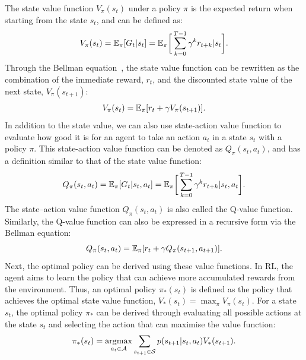The state value function $V_{\pi}(s_{t})$ under a policy $\pi$ is the expected return when starting from the state $s_{t}$, and can be defined as:
\begin{equation}
\centering
    V_{\pi}(s_{t}) = \mathbb{E}_{\pi}[G_{t}|s_{t}] = \mathbb{E}_{\pi}\biggr[\sum_{k=0}^{T-1} \gamma^{k}r_{t+k} | s_{t}\biggr].
\end{equation}
Through the Bellman equation~\cite{sutton2018reinforcement}, the state value function can be rewritten as the combination of the immediate reward, $r_{t}$, and the discounted state value of the next state, $V_{\pi}(s_{t+1})$:
\begin{equation}
\centering
     V_{\pi}(s_{t}) = \mathbb{E}_{\pi}[r_{t} + \gamma V_{\pi}(s_{t+1})].
\end{equation}
In addition to the state value, we can also use state-action value function to evaluate how good it is for an agent to take an action $a_{t}$ in a state $s_{t}$ with a policy $\pi$. This state-action value function can be denoted as $Q_{\pi}(s_{t},a_{t})$, and has a definition similar to that of the state value function:
\begin{equation}
\centering
     Q_{\pi}(s_{t},a_{t}) = \mathbb{E}_{\pi}[G_{t}|s_{t}, a_{t}] 
     = \mathbb{E}_{\pi}\biggr[\sum_{k=0}^{T-1} \gamma^{k}r_{t+k} | s_{t}, a_{t}\biggr].
\end{equation}
The state--action value function $Q_{\pi}(s_{t},a_{t})$ is also called the Q-value function. Similarly, the Q-value function can also be expressed in a recursive form via the Bellman equation:
\begin{equation}
\centering
     Q_{\pi}(s_{t},a_{t}) = \mathbb{E}_{\pi}[r_{t} + \gamma Q_{\pi}(s_{t+1}, a_{t+1})].
\end{equation}
Next, the optimal policy can be derived using these value functions. In RL, the agent aims to learn the policy that can achieve more accumulated rewards from the environment. Thus, an optimal policy $\pi_{*}(s_{t})$ is defined as the policy that achieves the optimal state value function, $V_{*}(s_{t})=\max_{\pi}V_{\pi}(s_{t})$. For a state $s_{t}$, the optimal policy $\pi_{*}$ can be derived through evaluating all possible actions at the state $s_{t}$ and selecting the action that can maximise the value function:
\begin{equation}
    \pi_{*}(s_{t}) = \operatorname*{\arg\!\max}_{a_{t}\in\mathcal{A}} \sum_{s_{t+1}\in\mathcal{S}} p(s_{t+1}|s_{t}, a_{t})V_{*}(s_{t+1}).
\end{equation}
